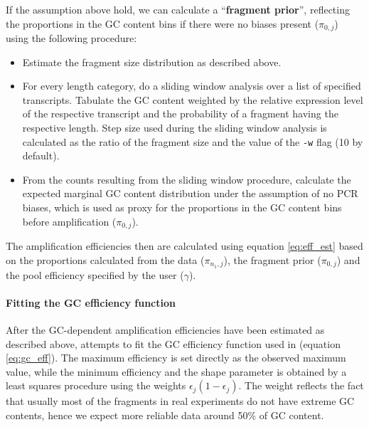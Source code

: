 If the assumption above hold, we can calculate a ``\textbf{fragment prior}'', reflecting the proportions in the GC content bins if there were no biases present ($\pi_{0,j}$) using the following procedure:

\begin{itemize}
    \item Estimate the fragment size distribution as described above.
    \item For every length category, do a sliding window analysis over a list of specified transcripts. Tabulate the GC content weighted by the relative expression level of the respective transcript and the probability of a fragment having the respective length. Step size used during the sliding window analysis is calculated as the ratio of the fragment size and the value of the \texttt{-w} flag (10 by default).
    \item From the counts resulting from the sliding window procedure, calculate the expected marginal GC content distribution under the assumption of no PCR biases, which is used as proxy for the proportions in the GC content bins before amplification ($\pi_{0,j}$).
\end{itemize}

The amplification efficiencies then are calculated using equation \ref{eq:eff_est} based on the proportions calculated from the data ($\pi_{n_1,j}$), the fragment prior ($\pi_{0,j}$) and the pool efficiency specified by the user ($\gamma$).


\paragraph{Fitting the GC efficiency function}

After the GC-dependent amplification efficiencies have been estimated as described above, \effest attempts to fit the GC efficiency function
used in \rlsim (equation \ref{eq:gc_eff}). The maximum efficiency is set directly as the observed maximum value, while the minimum efficiency and the shape parameter is obtained by a least squares procedure using the weights $\epsilon_j  (1 - \epsilon_j)$. The weight reflects the fact that usually most of the fragments in real experiments do not have extreme GC contents, hence we expect more reliable data around 50\% of GC content.

